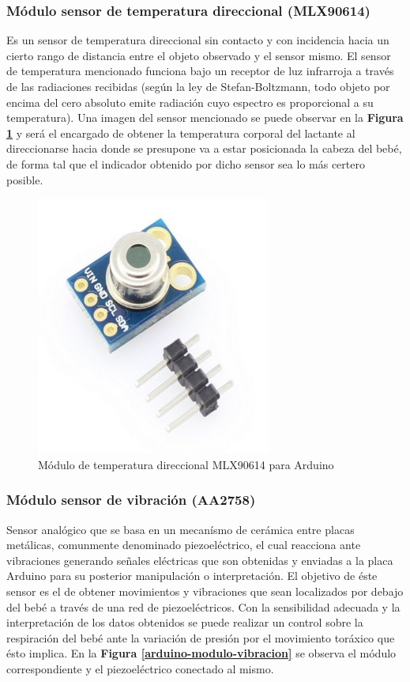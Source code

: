 \documentclass{IEEEtran}
\begin{document}
			\subsubsection{Módulo sensor de temperatura direccional (\textbf{MLX90614})}
			
			Es un sensor de temperatura direccional sin contacto y con incidencia hacia un cierto rango de distancia entre el objeto observado y el sensor mismo. El sensor de temperatura mencionado funciona bajo un receptor de luz infrarroja a través de las radiaciones recibidas (según la ley de Stefan-Boltzmann, todo objeto por encima del cero absoluto emite radiación cuyo espectro es proporcional a su temperatura). Una imagen del sensor mencionado se puede observar en la \textbf{Figura \ref{arduino-modulo-temperatura}} y será el encargado de obtener la temperatura corporal del lactante al direccionarse hacia donde se presupone va a estar posicionada la cabeza del bebé, de forma tal que el indicador obtenido por dicho sensor sea lo más certero posible.

				\begin{figure}
					\centering
					\includegraphics[width=0.6\linewidth]{arduino-modulo-temperatura}
					\caption{Módulo de temperatura direccional MLX90614 para Arduino}
					\label{arduino-modulo-temperatura}
				\end{figure}

			\subsubsection{Módulo sensor de vibración (\textbf{AA2758})}
			
			Sensor analógico que se basa en un mecanísmo de cerámica entre placas metálicas, comunmente denominado piezoeléctrico, el cual reacciona ante vibraciones generando señales eléctricas que son obtenidas y enviadas a la placa Arduino para su posterior manipulación o interpretación. El objetivo de éste sensor es el de obtener movimientos y vibraciones que sean localizados por debajo del bebé a través de una red de piezoeléctricos. Con la sensibilidad adecuada y la interpretación de los datos obtenidos se puede realizar un control sobre la respiración del bebé ante la variación de presión por el movimiento toráxico que ésto implica. En la \textbf{Figura \ref{arduino-modulo-vibracion}} se observa el módulo correspondiente y el piezoeléctrico conectado al mismo.
\end{document}
